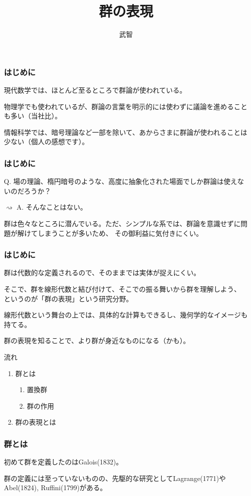 \documentclass[12pt, t]{beamer}
\title{群の表現}
\author{武智}
\begin{document}
\frame{\maketitle}

\begin{frame}
\frametitle{はじめに}
現代数学では、ほとんど至るところで群論が使われている。

物理学でも使われているが、群論の言葉を明示的には使わずに議論を進めることも多い（当社比）。

情報科学では、暗号理論など一部を除いて、あからさまに群論が使われることは少ない（個人の感想です）。
\end{frame}

\begin{frame}
\frametitle{はじめに}
Q. 場の理論、楕円暗号のような、高度に抽象化された場面でしか群論は使えないのだろうか？

$\rightsquigarrow$ A. そんなことはない。

群は色々なところに潜んでいる。ただ、シンプルな系では、群論を意識せずに問題が解けてしまうことが多いため、
その御利益に気付きにくい。
\end{frame}

\begin{frame}
\frametitle{はじめに}
群は代数的な定義されるので、そのままでは実体が捉えにくい。

そこで、群を線形代数と結び付けて、そこでの振る舞いから群を理解しよう、
というのが「群の表現」という研究分野。

線形代数という舞台の上では、具体的な計算もできるし、幾何学的なイメージも持てる。

群の表現を知ることで、より群が身近なものになる（かも）。
\end{frame}

\begin{frame}{流れ}
\begin{enumerate}
\item 群とは
\begin{enumerate}
\item 置換群
\item 群の作用
\end{enumerate}
\item 群の表現とは
\end{enumerate}
\end{frame}

\begin{frame}
\frametitle{群とは}
初めて群を定義したのはGalois(1832)。

群の定義には至っていないものの、先駆的な研究としてLagrange(1771)やAbel(1824), Ruffini(1799)がある。

\end{frame}
\end{document}
